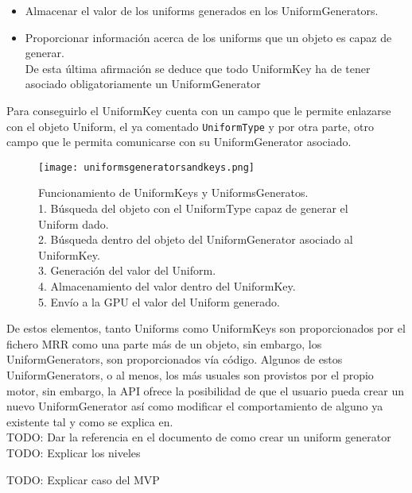 \begin{itemize}
\begin{itemize}
\item Almacenar el valor de los uniforms generados en los UniformGenerators.
\item Proporcionar información acerca de los uniforms que un objeto es capaz de generar.\\
De esta última afirmación se deduce que todo UniformKey ha de tener asociado obligatoriamente un UniformGenerator
\end{itemize}
Para conseguirlo el UniformKey cuenta con un campo que le permite enlazarse con el objeto Uniform, el ya comentado \texttt{UniformType} y por otra parte, otro campo que le permita comunicarse con su UniformGenerator asociado.
\end{itemize}

\begin{figure}[h!]
\begin{center}
\texttt{[image: uniformsgeneratorsandkeys.png]}
\end{center}
\caption[Funcionamiento de UniformKeys y UniformsGenerators]{Funcionamiento de UniformKeys y UniformsGeneratos.\\
1. Búsqueda del objeto con el UniformType capaz de generar el Uniform dado.\\
2. Búsqueda dentro del objeto del UniformGenerator asociado al UniformKey.\\
3. Generación del valor del Uniform.\\
4. Almacenamiento del valor dentro del UniformKey.\\
5. Envío a la GPU el valor del Uniform generado.}
\label{fig:unifkeysandgen}
\end{figure}

De estos elementos, tanto Uniforms como UniformKeys son proporcionados por el fichero MRR como una parte más de un objeto, sin embargo, los UniformGenerators, son proporcionados vía código. Algunos de estos UniformGenerators, o al menos, los más usuales son provistos por el propio motor, sin embargo, la API ofrece la posibilidad de que el usuario pueda crear un nuevo UniformGenerator así como modificar el comportamiento de alguno ya existente tal y como se explica en.\\
TODO: Dar la referencia en el documento de como crear un uniform generator\\

TODO: Explicar los niveles

TODO: Explicar caso del MVP

